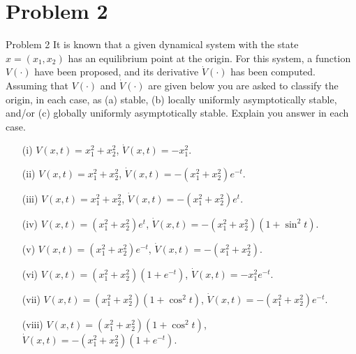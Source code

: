 \documentclass[8pt]{beamer}
\begin{document}




\section{Problem 2}

\begin{frame}[t]{Problem 2}
  It is known that a given dynamical system with the state $x=(x_1,x_2)$ has an equilibrium point at the origin. For this system, a function $V(\cdot)$ have been proposed, and its derivative $\dot V(\cdot)$
has been computed. Assuming that $V(\cdot)$ and $\dot V(\cdot)$ are given below you are asked to classify the origin, in each case, as (a) stable, (b) locally uniformly asymptotically stable, and/or (c) globally uniformly asymptotically stable. Explain you answer in each case.

\begin{itemize}
    \item[(i)] $V(x,t)=x_1^2+x_2^2$, $\dot V(x,t)=-x_1^2$.
    \item[(ii)] $V(x,t)=x_1^2+x_2^2$, $\dot V(x,t)=-(x_1^2+x_2^2)e^{-t}$.
    \item[(iii)] $V(x,t)=x_1^2+x_2^2$, $\dot V(x,t)=-(x_1^2+x_2^2)e^{t}$.
    \item[(iv)] $V(x,t)=(x_1^2+x_2^2)e^t$, $\dot V(x,t)=-(x_1^2+x_2^2)(1+\sin^2t)$.
    \item[(v)] $V(x,t)=(x_1^2+x_2^2)e^{-t}$, $\dot V(x,t)=-(x_1^2+x_2^2)$.
    \item[(vi)] $V(x,t)=(x_1^2+x_2^2)(1+e^{-t})$, $\dot V(x,t)=-x_1^2e^{-t}$.
    \item[(vii)] $V(x,t)=(x_1^2+x_2^2)(1+\cos^2t)$, $\dot V(x,t)=-(x_1^2+x_2^2)e^{-t}$.
    \item[(viii)] $V(x,t)=(x_1^2+x_2^2)(1+\cos^2t)$, $\dot V(x,t)=-(x_1^2+x_2^2)(1+e^{-t})$.
\end{itemize}
\end{frame}
\end{document}
